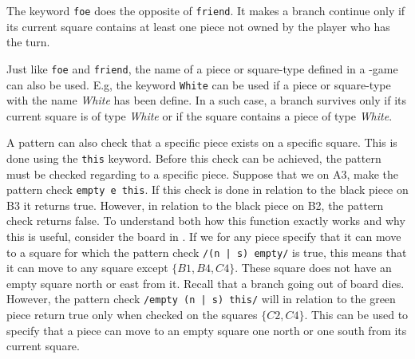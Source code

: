 The keyword \texttt{foe} does the opposite of \texttt{friend}. It makes a branch
continue only if its current square contains at least one piece not owned by the
player who has the turn.

Just like \texttt{foe} and \texttt{friend}, the name of a piece or square-type
defined in a \productname{}-game can also be used. E.g, the keyword
\texttt{White} can be used if a piece or square-type with the name
\textit{White} has been define. In a such case, a branch survives only if its
current square is of type \textit{White} or if the square contains a piece of
type \textit{White}.

A pattern can also check that a specific piece exists on a specific square. This
is done using the \texttt{this} keyword.  Before this check can be achieved, the
pattern must be checked regarding to a specific piece. Suppose that we on A3,
make the pattern check \texttt{empty e this}. If this check is done in relation
to the black piece on B3 it returns true. However, in relation to the black
piece on B2, the pattern check returns false. To understand both how this
function exactly works and why this is useful, consider the board in
.  If we for any piece specify that it can move to a
square for which the pattern check \texttt{/(n | s) empty/} is true, this means
that it can move to any square except $\{B1, B4, C4\}$. These square does not
have an empty square north or east from it. Recall that a branch going out of
board dies.  However, the pattern check \texttt{/empty (n | s) this/} will in
relation to the green piece return true only when checked on the squares $\{C2,
C4\}$.  This can be used to specify that a piece can move to an empty square one
north or one south from its current square. 
